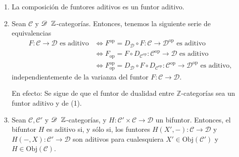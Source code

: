 \documentclass[tesis]{subfiles}
\begin{document}
\begin{Obs}\label{Obs: funtores aditivos}\leavevmode

    \begin{enumerate}[label=(\arabic*)]

        \item La composición de funtores aditivos es un funtor aditivo.
    
        \item Sean $\mathscr{C}$ y $\mathscr{D} \hspace{2mm} \mathbb{Z}$-categorías. Entonces, tenemos la siguiente serie de equivalencias
        \begin{align*}
            F:\mathscr{C}\to \mathscr{D} \text{ es aditivo} &\iff F^\text{op}=D_\mathscr{D}\circ F:\mathscr{C}\to \mathscr{D}^\text{op} \text{ es aditivo} \\
                                                             &\iff F_\text{op} = F\circ D_{\mathscr{C}^\text{op}}: \mathscr{C}^\text{op}\to \mathscr{D} \text{ es aditivo} \\
                                                             &\iff F_\text{op}^\text{op} = D_\mathscr{D}\circ F\circ D_{\mathscr{C}^\text{op}}: \mathscr{C}^\text{op}\to \mathscr{D}^\text{op} \text{ es aditivo},
        \end{align*}
        independientemente de la varianza del funtor $F:\mathscr{C}\to \mathscr{D}$.

        En efecto: Se sigue de que el funtor de dualidad entre $\mathbb{Z}$-categorías sea un funtor aditivo y de (1).

    \item Sean $\mathscr{C}, \mathscr{C}'$ y $\mathscr{D} \hspace{2mm} \mathbb{Z}$-categorías, y $H:\mathscr{C}'\times\mathscr{C}\to \mathscr{D}$ un bifuntor. Entonces, el bifuntor $H$ es aditivo si, y sólo si, los funtores $H(X',-):\mathscr{C}\to \mathscr{D}$ y $H(-,X):\mathscr{C}'\to \mathscr{D}$ son aditivos para cualesquiera $X'\in\text{Obj}(\mathscr{C}')$ y $H\in\text{Obj}(\mathscr{C})$.

    \end{enumerate}
\end{Obs}
\end{document}

